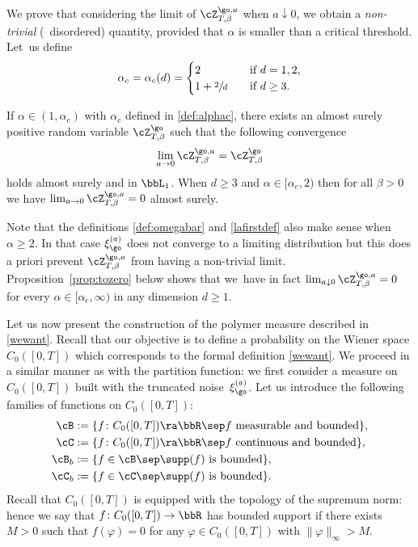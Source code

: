 We prove that considering the limit of $\cZ^{\go,a}_{T,\beta}$ when $a\downarrow0$, we obtain a \emph{non-trivial} (\ie \ disordered) quantity, provided that $\alpha$ is smaller than a critical threshold.
Let~us define
\begin{equation}
\label{def:alphac}
\alpha_c=\alpha_c(d) =
\begin{cases}
2 & \quad \text{if } d=1,2,\\
1+ \sfrac{2}{d}& \quad \text{if } d\ge 3.
\end{cases}
\end{equation}

\begin{theorem}
\label{thm:continuous}
If $\alpha\in (1,\alpha_c)$ with $\alpha_c$ defined in \eqref{def:alphac},
there exists an almost surely positive random variable $\cZ^{\go }_{T, \beta}$
such that the following convergence
\begin{equation*}
\lim_{a \to 0}\cZ^{\go,a }_{T, \beta}=\cZ^{\go }_{T, \beta}
\end{equation*}
holds almost surely and in $\bbL_1$.
When $d\ge 3$ and $\alpha\in [\alpha_c,2)$ then for all $\beta>0$ we have
$\lim_{a \to 0}\cZ^{\go,a }_{T, \beta}=0$ almost surely.
\end{theorem}

\begin{rem}
Note that the definitions \eqref{def:omegabar} and \eqref{lafirstdef} also make sense when $\alpha\ge 2$. In that case $\xi^{(a)}_{\go}$ does not converge to a limiting distribution but this does a priori prevent $\cZ^{\go,a}_{T,\beta}$ from having a non-trivial limit.
Proposition~\ref{prop:tozero} below shows that we~have in fact $\lim_{a\downarrow 0}\cZ^{\go,a }_{T, \beta} = 0$ for every $\alpha\in [\alpha_c,\infty)$ in any dimension $d\ge 1$.
\end{rem}

Let us now present the construction of the polymer measure described in \eqref{wewant}.
Recall that our objective is to define a probability on
the Wiener space $C_0([0,T])$
which corresponds to the formal definition \eqref{wewant}.
We proceed in a similar manner as with the partition function: we first consider a measure on $C_0([0,T])$ built with the truncated noise~$\xi_{\go}^{(a)}$.
Let us introduce the following families of functions on $C_0([0,T])$:%
\begin{equation}\label{thespaces}
\begin{split}
\cB&:=\{ f\colon C_0([0,T]) \ra \bbR \sep f \text{ measurable and bounded}\},\\
\cC&:=\{ f \colon C_0([0,T]) \ra \bbR \sep f \text{ continuous and bounded}\},\\
\cB_b&:=\{ f\in \cB \sep \supp(f) \text{ is bounded}\},\\
\cC_b&:=\{ f\in \cC \sep \supp(f) \text{ is bounded}\}.
\end{split}
\end{equation}
Recall that $C_0([0,T])$ is equipped with the topology of the supremum norm: hence we say that $f\colon C_0([0,T]) \to \bbR$ has bounded support if there exists $M>0$ such that $f(\varphi) =0$ for any $\varphi \in C_0([0,T])$ with $\|\varphi\|_{\infty} >M$.

